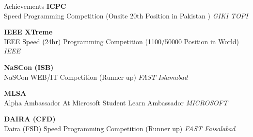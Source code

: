 \documentclass{resume}
\begin{document}
\begin{rSection}{Achievements} 
\textbf{ICPC } \\
Speed Programming Competition (Onsite 20th Position in Pakistan ) \hfill \textit{GIKI TOPI}

\textbf{IEEE XTreme } \\
IEEE Speed (24hr) Programming Competition  (1100/50000 Position in World) \hfill \textit{IEEE}

\textbf{NaSCon (ISB) } \\
NaSCon WEB/IT Competition  (Runner up) \hfill \textit{FAST Islamabad}

\textbf{MLSA } \\
Alpha Ambassador At Microsoft Student Learn Ambassador \hfill \textit{MICROSOFT}

\textbf{DAIRA (CFD) } \\
Daira (FSD) Speed Programming Competition (Runner up) \hfill \textit{FAST Faisalabad}






\end{rSection}
\end{document}
